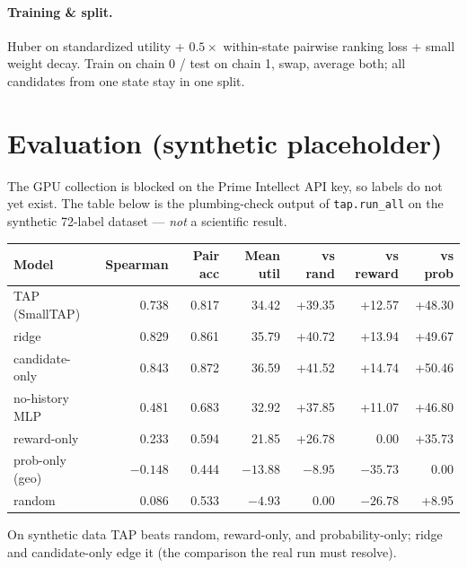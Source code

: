 \documentclass[11pt]{article}
\begin{document}
\paragraph{Training \& split.} Huber on standardized utility + $0.5\times$
within-state pairwise ranking loss + small weight decay. Train on chain 0 / test on
chain 1, swap, average both; all candidates from one state stay in one split.

\section{Evaluation (synthetic placeholder)}
The GPU collection is blocked on the Prime Intellect API key, so labels do not yet
exist. The table below is the plumbing-check output of \texttt{tap.run\_all} on the
synthetic 72-label dataset --- \emph{not} a scientific result.

\begin{longtable}{lrrrrrr}
\toprule
Model & Spearman & Pair acc & Mean util & vs rand & vs reward & vs prob\\
\midrule
\endhead
TAP (SmallTAP) & 0.738 & 0.817 & 34.42 & +39.35 & +12.57 & +48.30\\
ridge & 0.829 & 0.861 & 35.79 & +40.72 & +13.94 & +49.67\\
candidate-only & 0.843 & 0.872 & 36.59 & +41.52 & +14.74 & +50.46\\
no-history MLP & 0.481 & 0.683 & 32.92 & +37.85 & +11.07 & +46.80\\
reward-only & 0.233 & 0.594 & 21.85 & +26.78 & 0.00 & +35.73\\
prob-only (geo) & $-0.148$ & 0.444 & $-13.88$ & $-8.95$ & $-35.73$ & 0.00\\
random & 0.086 & 0.533 & $-4.93$ & 0.00 & $-26.78$ & +8.95\\
\bottomrule
\end{longtable}

On synthetic data TAP beats random, reward-only, and probability-only; ridge and
candidate-only edge it (the comparison the real run must resolve).
\end{document}
